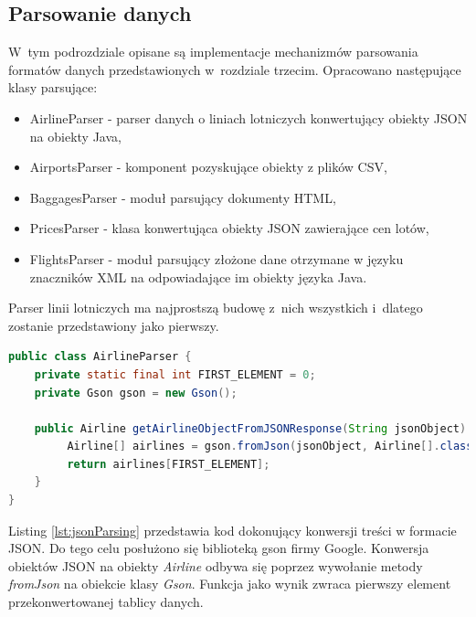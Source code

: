 \documentclass[12pt, twoside]{report}
\begin{document}
\subsection{Parsowanie danych}
W~tym podrozdziale opisane są implementacje mechanizmów parsowania formatów danych przedstawionych w~rozdziale trzecim. Opracowano następujące klasy parsujące:
\begin{itemize}[noitemsep,topsep=0pt]
\item AirlineParser - parser danych o liniach lotniczych konwertujący obiekty JSON na obiekty Java,
\item AirportsParser - komponent pozyskujące obiekty z plików CSV,
\item BaggagesParser - moduł parsujący dokumenty HTML,
\item PricesParser - klasa konwertująca obiekty JSON zawierające cen lotów,
\item FlightsParser - moduł parsujący złożone dane otrzymane w języku znaczników XML na odpowiadające im obiekty języka Java.
\end{itemize}
Parser linii lotniczych ma najprostszą budowę z~nich wszystkich i~dlatego zostanie przedstawiony jako pierwszy.
\begin{lstlisting}[language=java, caption=Implementacja parsowania treści JSON, label=lst:jsonParsing]
public class AirlineParser {
    private static final int FIRST_ELEMENT = 0;
    private Gson gson = new Gson();

    public Airline getAirlineObjectFromJSONResponse(String jsonObject) {
         Airline[] airlines = gson.fromJson(jsonObject, Airline[].class);
         return airlines[FIRST_ELEMENT];
    }
}
\end{lstlisting}
Listing \ref{lst:jsonParsing} przedstawia kod dokonujący konwersji treści w formacie JSON. Do tego celu posłużono się biblioteką gson firmy Google. Konwersja obiektów JSON na obiekty \emph{Airline} odbywa się poprzez wywołanie metody \emph{fromJson} na obiekcie klasy \emph{Gson}. Funkcja jako wynik zwraca pierwszy element przekonwertowanej tablicy danych.
\end{document}
